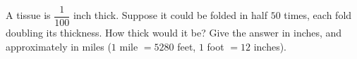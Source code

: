 A tissue is $\dfrac{1}{100}$ inch thick. Suppose it could be folded in half $50$ times, each fold doubling its thickness. How thick would it be? Give the answer in inches, and approximately in miles ($1$ mile $=5280$ feet, $1$ foot $=12$ inches).
